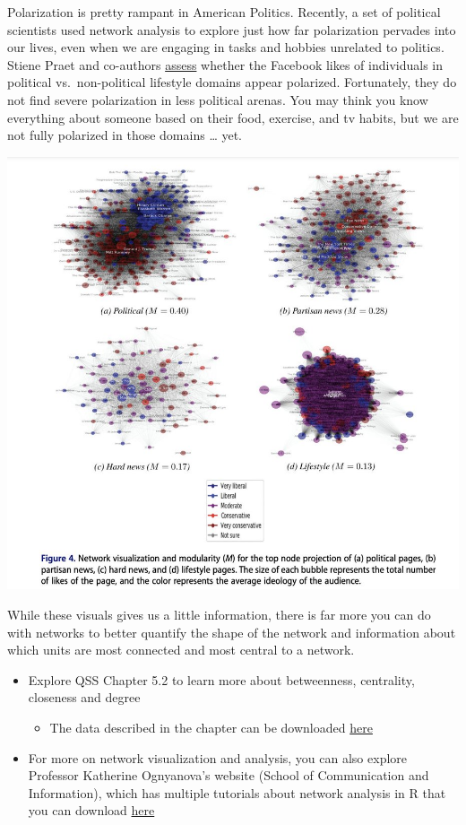 \documentclass[
  letterpaper,
  DIV=11,
  numbers=noendperiod]{scrreprt}
\providecommand{\tightlist}{%
  \setlength{\itemsep}{0pt}\setlength{\parskip}{0pt}}\usepackage{longtable,booktabs,array}
\begin{document}
Polarization is pretty rampant in American Politics. Recently, a set of
political scientists used network analysis to explore just how far
polarization pervades into our lives, even when we are engaging in tasks
and hobbies unrelated to politics. Stiene Praet and co-authors
\href{https://www.tandfonline.com/doi/abs/10.1080/10584609.2021.1994066}{assess}
whether the Facebook likes of individuals in political vs.~non-political
lifestyle domains appear polarized. Fortunately, they do not find severe
polarization in less political arenas. You may think you know everything
about someone based on their food, exercise, and tv habits, but we are
not fully polarized in those domains \ldots{} yet.

\includegraphics{images/networkviz.jpeg}

While these visuals gives us a little information, there is far more you
can do with networks to better quantify the shape of the network and
information about which units are most connected and most central to a
network.

\begin{itemize}
\tightlist
\item
  Explore QSS Chapter 5.2 to learn more about betweenness, centrality,
  closeness and degree

  \begin{itemize}
  \tightlist
  \item
    The data described in the chapter can be downloaded
    \href{https://qss.princeton.press/student-resources-for-quantitative-social-science/}{here}
  \end{itemize}
\item
  For more on network visualization and analysis, you can also explore
  Professor Katherine Ognyanova's website (School of Communication and
  Information), which has multiple tutorials about network analysis in R
  that you can download \href{https://kateto.net/tutorials/}{here}
\end{itemize}
\end{document}
